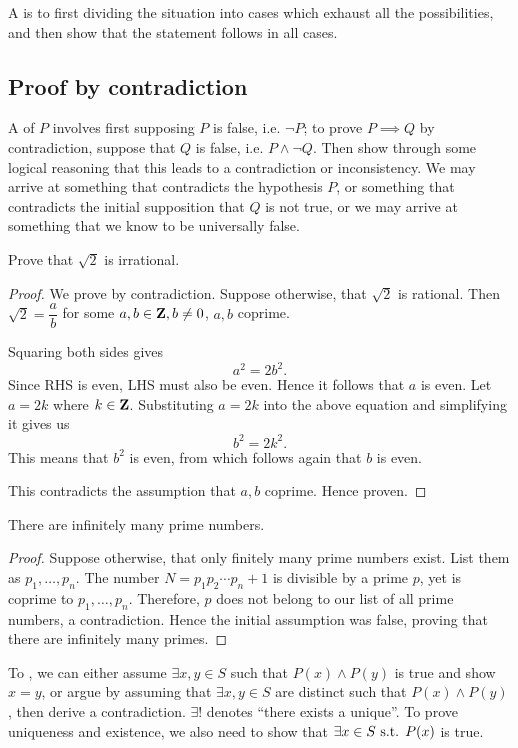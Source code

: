 A  is to first dividing the situation into cases which exhaust all the possibilities, and then show that the statement follows in all cases.

\subsection{Proof by contradiction}
A  of $P$ involves first supposing $P$ is false, i.e. $\lnot P$; to prove $P \implies Q$ by contradiction, suppose that $Q$ is false, i.e. $P\land\lnot Q$. Then show through some logical reasoning that this leads to a contradiction or inconsistency. We may arrive at something that contradicts the hypothesis $P$, or something that contradicts the initial supposition that $Q$ is not true, or we may arrive at something that we know to be universally false.

\begin{exercise}
Prove that $\sqrt{2}$ is irrational.
\end{exercise}
\begin{proof}
We prove by contradiction. Suppose otherwise, that $\sqrt{2}$ is rational. Then $\sqrt{2}=\dfrac{a}{b}$ for some $a,b\in\mathbf Z,b\neq 0$, $a,b$ coprime.

Squaring both sides gives
\[a^2=2b^2.\]
Since RHS is even, LHS must also be even. Hence it follows that $a$ is even. Let $a=2k$ where $k\in\mathbf Z$. Substituting $a = 2k$ into the above equation and simplifying it gives us
\[b^2=2k^2.\]
This means that $b^2$ is even, from which follows again that $b$ is even. 

This contradicts the assumption that $a,b$ coprime. Hence proven.
\end{proof}

\begin{exercise}
There are infinitely many prime numbers.
\end{exercise}

\begin{proof}
Suppose otherwise, that only finitely many prime numbers exist. List them as $p_1,\dots,p_n$. The number $N=p_1p_2\cdots p_n+1$ is divisible by a prime $p$, yet is coprime to $p_1,\dots,p_n$. Therefore, $p$ does not belong to our list of all prime numbers, a contradiction. Hence the initial assumption was false, proving that there are infinitely many primes.
\end{proof}

To , we can either assume $\exists x,y \in S$ such that $P(x) \land P(y)$ is true and show $x=y$, or argue by assuming that $\exists x,y \in S$ are distinct such that $P(x) \land P(y)$, then derive a contradiction. $\exists!$ denotes ``there exists a unique''. To prove uniqueness and existence, we also need to show that $\exists x \in S \text{ s.t. } P(x)$ is true.

